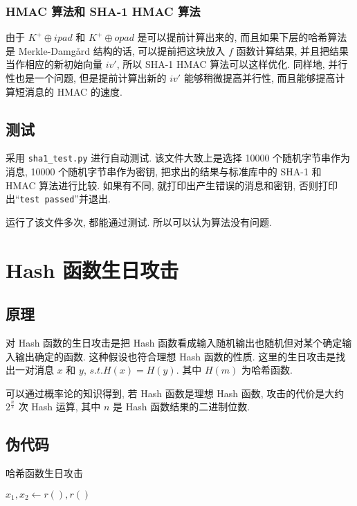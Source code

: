 \documentclass[12pt,a4paper]{article}
\begin{document}
\subsubsection*{HMAC 算法和 SHA-1 HMAC 算法}

由于 $ K^+ \oplus ipad $ 和 $ K^+ \oplus opad $ 是可以提前计算出来的, 而且如果下层的哈希算法是 Merkle-Damgård 结构的话, 可以提前把这块放入 $ f $ 函数计算结果, 并且把结果当作相应的新初始向量 $ iv' $, 所以 SHA-1 HMAC 算法可以这样优化. 同样地, 并行性也是一个问题, 但是提前计算出新的 $ iv' $ 能够稍微提高并行性, 而且能够提高计算短消息的 HMAC 的速度. 

\subsection*{测试}

采用 \verb|sha1_test.py| 进行自动测试. 该文件大致上是选择 10000 个随机字节串作为消息, 10000 个随机字节串作为密钥, 把求出的结果与标准库中的 SHA-1 和 HMAC 算法进行比较. 如果有不同, 就打印出产生错误的消息和密钥, 否则打印出“\verb|test passed|”并退出. 

运行了该文件多次, 都能通过测试. 所以可以认为算法没有问题. 

\section*{Hash 函数生日攻击}

\subsection*{原理}

对 Hash 函数的生日攻击是把 Hash 函数看成输入随机输出也随机但对某个确定输入输出确定的函数. 这种假设也符合理想 Hash 函数的性质. 这里的生日攻击是找出一对消息 $ x $ 和 $ y $, $ s.t. H(x) = H(y) $. 其中 $ H(m) $ 为哈希函数. 

可以通过概率论的知识得到, 若 Hash 函数是理想 Hash 函数, 攻击的代价是大约 $ 2^{\frac{n}{2}} $ 次 Hash 运算, 其中 $ n $ 是 Hash 函数结果的二进制位数. 

\subsection*{伪代码}

\begin{algorithm}[H]
\caption{哈希函数生日攻击}

$ x_1, x_2 \leftarrow r(), r() $


\end{algorithm}
\end{document}
